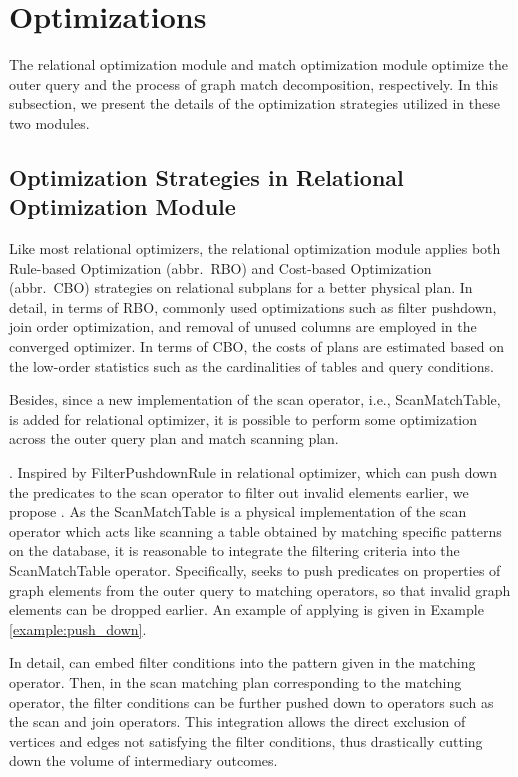 \section{Optimizations}
\label{sec:optimizations}

The relational optimization module and match optimization module optimize the outer query and the process of graph match decomposition, respectively.
In this subsection, we present the details of the optimization strategies utilized in these two modules. 

\subsection{Optimization Strategies in Relational Optimization Module}

Like most relational optimizers, the relational optimization module applies both Rule-based Optimization (abbr.~RBO) and Cost-based Optimization (abbr.~CBO) strategies on relational subplans for a better physical plan.
In detail, in terms of RBO, commonly used optimizations such as filter pushdown, join order optimization, and removal of unused columns are employed in the converged optimizer.
In terms of CBO, the costs of plans are estimated based on the low-order statistics such as the cardinalities of tables and query conditions.

Besides, since a new implementation of the scan operator, i.e., ScanMatchTable, is added for relational optimizer, it is possible to perform some optimization across the outer query plan and match scanning plan.

\filterrule. 
Inspired by FilterPushdownRule in relational optimizer, which can push down the predicates to the scan operator to filter out invalid elements earlier, we propose \filterrule.
As the ScanMatchTable is a physical implementation of the scan operator which acts like scanning a table obtained by matching specific patterns on the database, it is reasonable to integrate the filtering criteria into the ScanMatchTable operator.
Specifically, \filterrule seeks to push predicates on properties of graph elements from the outer query to matching operators, so that invalid graph elements can be dropped earlier.
An example of applying \filterrule is given in Example \ref{example:push_down}.

In detail, \filterrule can embed filter conditions into the pattern given in the matching operator.
Then, in the scan matching plan corresponding to the matching operator, the filter conditions can be further pushed down to operators such as the scan and join operators.
This integration allows the direct exclusion of vertices and edges not satisfying the filter conditions, thus drastically cutting down the volume of intermediary outcomes.

